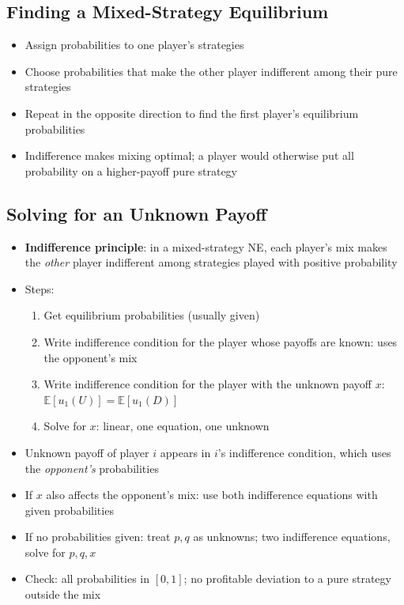 \subsection{Finding a Mixed-Strategy Equilibrium}
\begin{itemize}
    \item Assign probabilities to one player's strategies
    \item Choose probabilities that make the other player indifferent among their pure strategies
    \item Repeat in the opposite direction to find the first player's equilibrium probabilities
    \item Indifference makes mixing optimal; a player would otherwise put all probability on a higher-payoff pure strategy
\end{itemize}

\subsection{Solving for an Unknown Payoff}
\begin{itemize}
    \item \textbf{Indifference principle}: in a mixed-strategy NE, each player's mix makes the \emph{other} player indifferent among strategies played with positive probability
    \item Steps:
          \begin{enumerate}
              \item Get equilibrium probabilities (usually given)
              \item Write indifference condition for the player whose payoffs are known: uses the opponent's mix
              \item Write indifference condition for the player with the unknown payoff $x$: $\mathbb{E}[u_1(U)] = \mathbb{E}[u_1(D)]$
              \item Solve for $x$: linear, one equation, one unknown
          \end{enumerate}
    \item Unknown payoff of player $i$ appears in $i$'s indifference condition, which uses the \emph{opponent's} probabilities
    \item If $x$ also affects the opponent's mix: use both indifference equations with given probabilities
    \item If no probabilities given: treat $p,q$ as unknowns; two indifference equations, solve for $p,q,x$
    \item Check: all probabilities in $[0,1]$; no profitable deviation to a pure strategy outside the mix
\end{itemize}

